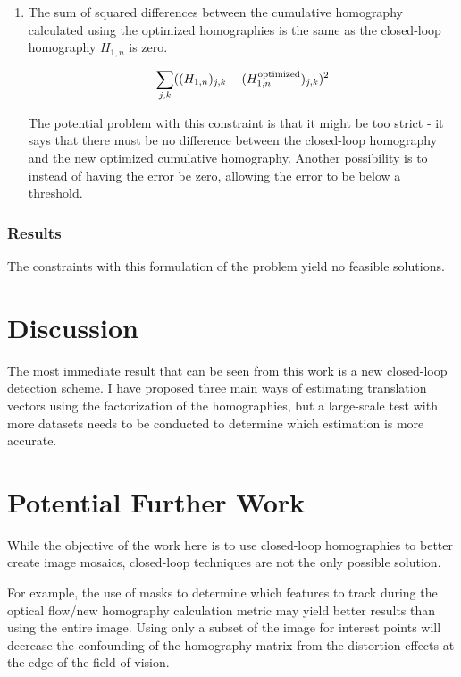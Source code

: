 \documentclass{article}
\begin{document}
\begin{enumerate}

\item The sum of squared differences between the cumulative homography
calculated using the optimized homographies is the same as the closed-loop
homography $H_{1, n}$ is zero.

\[\sum_{j, k} ((H_{1, n})_{j, k} - (H_{1, n}^{\textnormal{optimized}})_{j, k})^2\] 

The potential problem with this constraint is that it might be too strict - it
says that there must be no difference between the closed-loop homography and
the new optimized cumulative homography. Another possibility is to instead of
having the error be zero, allowing the error to be below a threshold.

\end{enumerate}

\subsubsection{Results}

The constraints with this formulation of the problem yield no feasible
solutions. 

\section{Discussion}

The most immediate result that can be seen from this work is a new closed-loop
detection scheme. I have proposed three main ways of estimating translation
vectors using the factorization of the homographies, but a large-scale test
with more datasets needs to be conducted to determine which estimation is more
accurate. 

\section{Potential Further Work}
\label{sec:later}

While the objective of the work here is to use closed-loop homographies to
better create image mosaics, closed-loop techniques are not the only possible
solution. 

For example, the use of masks to determine which features to track
during the optical flow/new homography calculation metric may yield better
results than using the entire image. Using only a subset of the image for
interest points will decrease the confounding of the homography matrix from the
distortion effects at the edge of the field of vision.  
\end{document}
